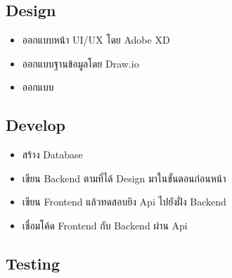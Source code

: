 \subsection{Design}
\begin{itemize}
  \item ออกแบบหน้า UI/UX โดย Adobe XD
  \item ออกแบบฐานข้อมูลโดย Draw.io
  \item ออกแบบ
\end{itemize}

\subsection{Develop}
\begin{itemize}
  \item สร้าง Database
  \item เขียน Backend ตามที่ได้ Design มาในขั้นตอนก่อนหน้า
  \item เขียน Frontend แล้วทดสอบยิง Api ไปยังฝั่ง Backend
  \item เชื่อมโค้ด Frontend กับ Backend ผ่าน Api
\end{itemize}

\subsection{Testing}
